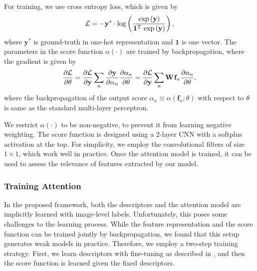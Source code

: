 \documentclass[10pt,twocolumn,letterpaper]{article}
\begin{document}
For training, we use cross entropy loss, which is given by
\begin{equation}
	\mathcal{L} =
		- \mathbf{y}^*
		\cdot \mathrm{log} \left(
		\frac{
			\mathrm{exp} \left(\mathbf{y}\right)
		}{
			\mathbf{1}^{\text T} \ \mathrm{exp}\left(\mathbf{y}\right)
		}
		\right),
\end{equation}
where $\mathbf{y}^*$ is ground-truth in one-hot representation and $\mathbf{1}$ is one vector.
The parameters in the score function $\alpha(\cdot)$ are trained by backpropagation, where the gradient is given by
\begin{equation}
\begin{split}
\frac
	{\partial \mathcal{L}}
	{\partial \theta}
	=
		\frac
			{\partial \mathcal{L}}
			{\partial \mathbf{y}}
		\sum_{n} 
			\frac
				{\partial \mathbf{y}}
				{\partial \alpha_n}
			\frac
				{\partial \alpha_n}
				{\partial \theta}
=
		\frac
			{\partial \mathcal{L}}
			{\partial \mathbf{y}}
		\sum_{n} 
			\mathbf{W}
			\hspace{0.03cm}
			\mathbf{f}_n
			\frac
				{\partial \alpha_n}
				{\partial \theta},
\end{split}
\end{equation}
where the backpropagation of the output score $\alpha_n \equiv \alpha(\mathbf{f}_n ; \theta)$ with respect to $\theta$ is same as the standard multi-layer perceptron.

We restrict $\alpha(\cdot)$ to be non-negative, to prevent it from learning negative weighting.
The score function is designed using a 2-layer CNN with a softplus~\cite{dugas2001incorporating} activation at the top.
For simplicity, we employ the convolutional filters of size $1\times 1$, which work well in practice.
Once the attention model is trained, it can be used to assess the relevance of features extracted by our model.


\subsubsection{Training Attention}

In the proposed framework, both the descriptors and the attention model are implicitly learned with image-level labels.
Unfortunately, this poses some challenges to the learning process.
While the feature representation and the score function can be trained jointly by
backpropagation, we found that this setup generates weak models in practice.
Therefore, we employ a two-step training strategy.
First, we learn descriptors with fine-tuning as described in , and then the score function is learned given the fixed descriptors.
\end{document}
